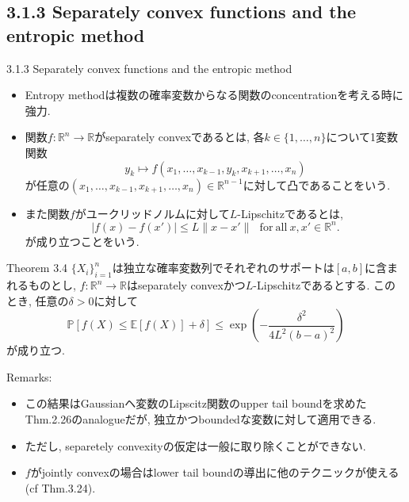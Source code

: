 \documentclass[aspectratio=169, dvipdfmx]{beamer}
\newcommand{\ex}{\mathbb{E}}
\begin{document}
\subsection{3.1.3 Separately convex functions and the entropic method}
\begin{frame}{3.1.3 Separately convex functions and the entropic method}
\begin{itemize}
    \item Entropy methodは複数の確率変数からなる関数のconcentrationを考える時に強力.
    \item 関数$f:\mathbb{R}^n \to \mathbb{R}$が{separately convex}であるとは,
          各$k\in\{1,\dots,n\}$について1変数関数
          \[y_k \mapsto f(x_1,\dots,x_{k-1},y_k,x_{k+1},\dots,x_n)\]
          が任意の$(x_1,\dots,x_{k-1},x_{k+1},\dots,x_n) \in \mathbb{R}^{n-1}$に対して凸であることをいう.
    \item また関数$f$がユークリッドノルムに対して$L$-Lipschitzであるとは,
          \[
              \left|f(x)-f(x')\right| \le L \|x-x'\|
              \ \ \ \mathrm{for\ all}\ x,x'\in\mathbb{R}^n.
          \]
          が成り立つことをいう.
\end{itemize}
\end{frame}

\begin{frame}
\begin{block}{Theorem 3.4}
    $\{X_i\}_{i=1}^n$は独立な確率変数列でそれぞれのサポートは$[a,b]$に含まれるものとし,
    $f:\mathbb{R}^n\to\mathbb{R}$はseparately convexかつ$L$-Lipschitzであるとする.
    このとき, 任意の$\delta > 0$に対して
    \[
        \mathbb{P}\left[ f(X) \le \ex[f(X)] + \delta \right]
        \le \exp\left(-\frac{\delta^2}{4L^2(b-a)^2}\right)
        \tag{3.16}\label{3.16}
    \]
    が成り立つ.
\end{block}
{Remarks:}
\begin{itemize}
    \item この結果はGaussianヘ変数のLipscitz関数のupper tail boundを求めたThm.2.26のanalogueだが,
          独立かつboundedな変数に対して適用できる.
    \item ただし, separetely convexityの仮定は一般に取り除くことができない.
    \item $f$がjointly convexの場合はlower tail boundの導出に他のテクニックが使える(cf Thm.3.24).
\end{itemize}
\end{frame}
\end{document}
